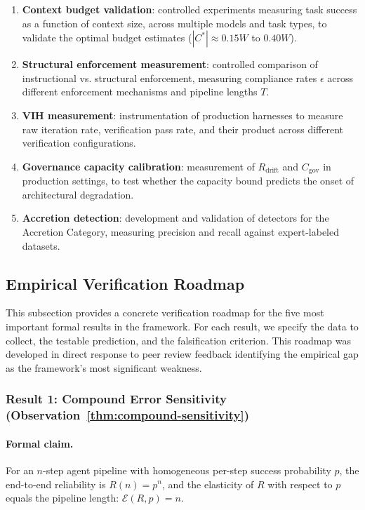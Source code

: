 \documentclass[11pt, a4paper]{googledeepmind}
\begin{document}
\begin{enumerate}
    \item \textbf{Context budget validation}: controlled experiments measuring task success as a function of context size, across multiple models and task types, to validate the optimal budget estimates ($|C^*| \approx 0.15W$ to $0.40W$).
    \item \textbf{Structural enforcement measurement}: controlled comparison of instructional vs. structural enforcement, measuring compliance rates $\epsilon$ across different enforcement mechanisms and pipeline lengths $T$.
    \item \textbf{VIH measurement}: instrumentation of production harnesses to measure raw iteration rate, verification pass rate, and their product across different verification configurations.
    \item \textbf{Governance capacity calibration}: measurement of $R_{\text{drift}}$ and $C_{\text{gov}}$ in production settings, to test whether the capacity bound predicts the onset of architectural degradation.
    \item \textbf{Accretion detection}: development and validation of detectors for the Accretion Category, measuring precision and recall against expert-labeled datasets.
\end{enumerate}

\subsection{Empirical Verification Roadmap}
\label{sec:verification-roadmap}

This subsection provides a concrete verification roadmap for the five most important formal results in the framework. For each result, we specify the data to collect, the testable prediction, and the falsification criterion. This roadmap was developed in direct response to peer review feedback identifying the empirical gap as the framework's most significant weakness.

\subsubsection{Result 1: Compound Error Sensitivity (Observation~\ref{thm:compound-sensitivity})}

\paragraph{Formal claim.} For an $n$-step agent pipeline with homogeneous per-step success probability $p$, the end-to-end reliability is $R(n) = p^n$, and the elasticity of $R$ with respect to $p$ equals the pipeline length: $\mathcal{E}(R,p) = n$.
\end{document}
